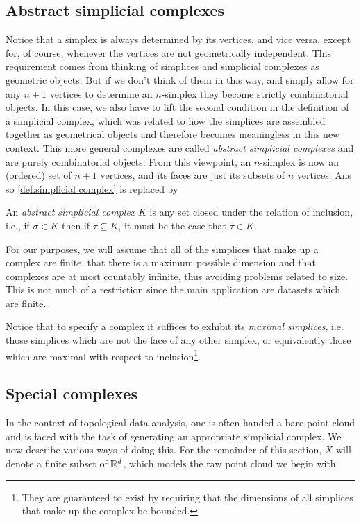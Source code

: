 \documentclass[../main.tex]{subfiles}
\begin{document}
\subsection{Abstract simplicial complexes}
Notice that a simplex is always determined by its vertices, and vice versa, except for, of
course, whenever the vertices are not geometrically independent. This requirement comes
from thinking of simplices and simplicial complexes as geometric objects. But if we don't
think of them in this way, and simply allow for any \( n+1 \) vertices to determine an \(
n \)-simplex they become strictly combinatorial objects. In this case, we also have to
lift the second condition in the definition of a simplicial complex, which was related to
how the simplices are assembled together as geometrical objects and therefore becomes
meaningless in this new context. This more general complexes are called \emph{abstract
simplicial complexes} and are purely combinatorial objects. From this viewpoint, an \( n
\)-simplex is now an (ordered) set of \( n+1 \) vertices, and its faces are just its
subsets of \( n \) vertices.  Ans so \cref{def:simplicial complex} is replaced by
\begin{definition}
	An \emph{abstract simplicial complex} \( K \) is any set closed under the relation of
	inclusion, i.e., if \( \sigma \in K \) then if \( \tau \subseteq K \), it must be the
	case that \( \tau \in K \).  
\end{definition}
For our purposes, we will assume that all of the simplices that make up a complex are
finite, that there is a maximum possible dimension  and that complexes are at most
countably infinite, thus avoiding problems related to size. This is not much of a
restriction since the main application are datasets which are finite. 

Notice that to specify a complex it suffices to exhibit its \emph{maximal simplices}, i.e.
those simplices which are not the face of any other simplex, or equivalently those which
are maximal with respect to inclusion\footnote{They are guaranteed to exist by requiring that the
dimensions of all simplices that make up the complex be bounded.}.

\subsection{Special complexes}
In the context of topological data analysis, one is often handed a bare point cloud and is
faced with the task of generating an appropriate simplicial complex. We now describe
various ways of doing this.  For the remainder of this section, \( X \) will denote a
finite subset of \( \mathbb{R}^d \), which models the raw point cloud we begin with. 
\end{document}
